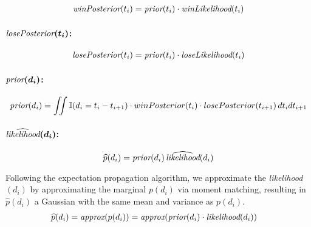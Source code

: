 \documentclass[article]{jss}
\begin{document}
\begin{equation}
 \begin{split}
  \emph{winPosterior}(t_{i}) = \emph{prior}(t_i) \cdot \emph{winLikelihood}(t_i)
 \end{split}
\end{equation}


\paragraph{$\bm{\emph{losePosterior}(t_i)}$:}

\begin{equation}
 \begin{split}
  \emph{losePosterior}(t_{i}) = \emph{prior}(t_i) \cdot \emph{loseLikelihood}(t_i)
 \end{split}
\end{equation}


\paragraph{$\bm{\emph{prior}(d_i)}$:}

\begin{equation}
 \begin{split}
  \emph{prior}(d_{i}) = \iint \mathbb{I}(d_{i} = t_i - t_{i+1} ) \cdot winPosterior(t_i) \cdot losePosterior(t_{i+1}) \, dt_idt_{i+1} 
 \end{split}
\end{equation}


\paragraph{$\bm{\widehat{\emph{likelihood}}(d_i)}$:}

\begin{equation}
\widehat{p}(d_i) = \emph{prior}(d_i) \, \widehat{\emph{likelihood}}(d_i)
\end{equation}

Following the expectation propagation algorithm, we approximate the \emph{likelihood}$(d_i)$ by approximating the marginal $p(d_i)$ via moment matching, resulting in $\widehat{p}(d_i)$ a Gaussian with the same mean and variance as $p(d_i)$.
\begin{equation}
\begin{split}
 \widehat{p}(d_i) & = \emph{approx}(p(d_i)) = \emph{approx}(\emph{prior}(d_i) \cdot \emph{likelihood}(d_i)) 
 \end{split}
\end{equation}
\end{document}
